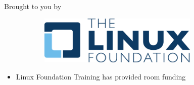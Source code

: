 \begin{frame}
   {Brought to you by}
   \begin{figure}[H]
      \centering
      \begin{subfigure}{0.4\textwidth}
         \centering
         \includegraphics[width=3in]{IMAGES/LF-logo}
      \end{subfigure}
   \end{figure}
   \begin{itemize}
      \item Linux Foundation Training has provided room funding
   \end{itemize}
\end{frame}

\cprotect\note{

}

